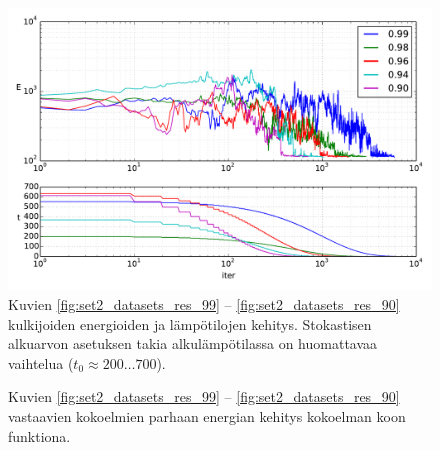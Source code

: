 \begin{figure}[p]
    \centering
    \includegraphics[width=1\linewidth]{figures/set2_walkers_temp.pdf}
    \caption{
        Kuvien \ref{fig:set2_datasets_res_99} -- \ref{fig:set2_datasets_res_90} kulkijoiden energioiden ja lämpötilojen kehitys.
        Stokastisen alkuarvon asetuksen takia alkulämpötilassa on huomattavaa vaihtelua ($t_0 \approx 200 \dots 700$).
        \label{fig:set2_walkers_temp}
    }
\end{figure}

\begin{figure}[p]
    \centering
    \caption{Kuvien \ref{fig:set2_datasets_res_99} -- \ref{fig:set2_datasets_res_90} vastaavien kokoelmien parhaan energian kehitys kokoelman koon funktiona.
        \label{fig:set2_best_final_e_walkers}
    }
\end{figure}

\FloatBarrier

